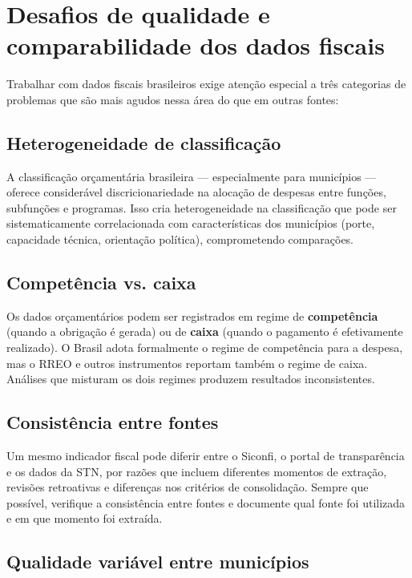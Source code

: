 \section{Desafios de qualidade e comparabilidade dos dados fiscais}

Trabalhar com dados fiscais brasileiros exige atenção especial a três categorias de problemas que são mais agudos nessa área do que em outras fontes:

\subsection{Heterogeneidade de classificação}

A classificação orçamentária brasileira --- especialmente para municípios --- oferece considerável discricionariedade na alocação de despesas entre funções, subfunções e programas. Isso cria heterogeneidade na classificação que pode ser sistematicamente correlacionada com características dos municípios (porte, capacidade técnica, orientação política), comprometendo comparações.

\subsection{Competência vs. caixa}

Os dados orçamentários podem ser registrados em regime de \textbf{competência} (quando a obrigação é gerada) ou de \textbf{caixa} (quando o pagamento é efetivamente realizado). O Brasil adota formalmente o regime de competência para a despesa, mas o RREO e outros instrumentos reportam também o regime de caixa. Análises que misturam os dois regimes produzem resultados inconsistentes.

\subsection{Consistência entre fontes}

Um mesmo indicador fiscal pode diferir entre o Siconfi, o portal de transparência e os dados da STN, por razões que incluem diferentes momentos de extração, revisões retroativas e diferenças nos critérios de consolidação. Sempre que possível, verifique a consistência entre fontes e documente qual fonte foi utilizada e em que momento foi extraída.

\subsection{Qualidade variável entre municípios}


